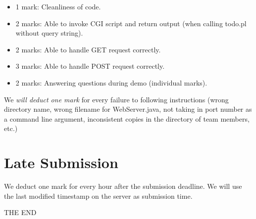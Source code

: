 \documentclass[a4paper,11pt]{exam}
\begin{document}
\begin{itemize}
\item 1 mark: Cleanliness of code. 
\item 2 marks: Able to invoke CGI script and return output (when calling todo.pl without query string).
\item 2 marks: Able to handle GET request correctly.
\item 3 marks: Able to handle POST request correctly.
\item 2 marks: Answering questions during demo (individual marks).
\end{itemize}

We \textit{will deduct one mark} for every failure to following instructions (wrong directory name, wrong filename for WebServer.java, not taking in port number as a command line argument, inconsistent copies in the directory of team members, etc.)

\section*{Late Submission}

We deduct one mark for every hour after the submission deadline.  We will use the last modified timestamp on the server as submission time.

\vfill
\center\Huge{THE END}
\end{document}
